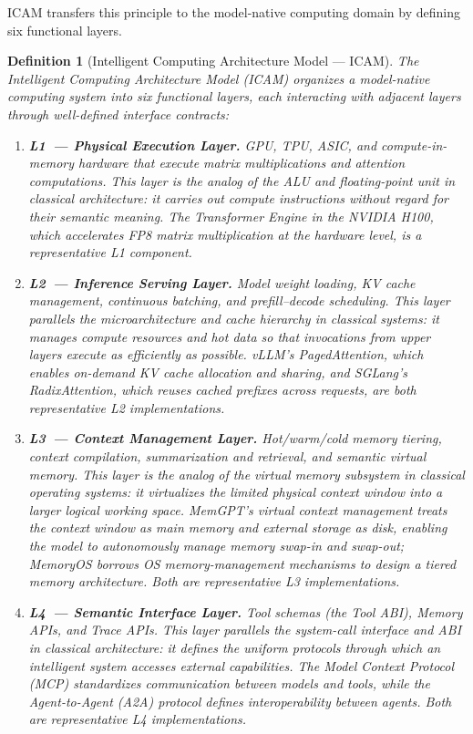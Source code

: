 \documentclass[11pt,a4paper]{article}
\newtheorem{definition}{Definition}[section]
\begin{document}
ICAM transfers this principle to the model-native computing domain by defining six functional layers.

\begin{definition}[Intelligent Computing Architecture Model --- ICAM]
The Intelligent Computing Architecture Model (ICAM) organizes a model-native computing system into six functional layers, each interacting with adjacent layers through well-defined interface contracts:
\begin{enumerate}[nosep]
\item \textbf{L1~--- Physical Execution Layer.}
GPU, TPU, ASIC, and compute-in-memory hardware that execute matrix multiplications and attention computations. This layer is the analog of the ALU and floating-point unit in classical architecture: it carries out compute instructions without regard for their semantic meaning. The Transformer Engine in the NVIDIA H100, which accelerates FP8 matrix multiplication at the hardware level, is a representative L1 component\cite{wolters2024computeinmemory}.

\item \textbf{L2~--- Inference Serving Layer.}
Model weight loading, KV cache management, continuous batching, and prefill--decode scheduling. This layer parallels the microarchitecture and cache hierarchy in classical systems: it manages compute resources and hot data so that invocations from upper layers execute as efficiently as possible. vLLM's PagedAttention, which enables on-demand KV cache allocation and sharing\cite{kwon2023pagedattention}, and SGLang's RadixAttention, which reuses cached prefixes across requests\cite{sglang2024}, are both representative L2 implementations.

\item \textbf{L3~--- Context Management Layer.}
Hot/warm/cold memory tiering, context compilation, summarization and retrieval, and semantic virtual memory. This layer is the analog of the virtual memory subsystem in classical operating systems: it virtualizes the limited physical context window into a larger logical working space. MemGPT's \textit{virtual context management} treats the context window as main memory and external storage as disk, enabling the model to autonomously manage memory swap-in and swap-out\cite{memgpt2023}; MemoryOS borrows OS memory-management mechanisms to design a tiered memory architecture\cite{memoryos2025}. Both are representative L3 implementations.

\item \textbf{L4~--- Semantic Interface Layer.}
Tool schemas (the Tool ABI), Memory APIs, and Trace APIs. This layer parallels the system-call interface and ABI in classical architecture: it defines the uniform protocols through which an intelligent system accesses external capabilities. The Model Context Protocol (MCP) standardizes communication between models and tools\cite{mcp_intro_2026}, while the Agent-to-Agent (A2A) protocol defines interoperability between agents\cite{agentprotocols2025}. Both are representative L4 implementations.


\end{enumerate}
\end{definition}
\end{document}
